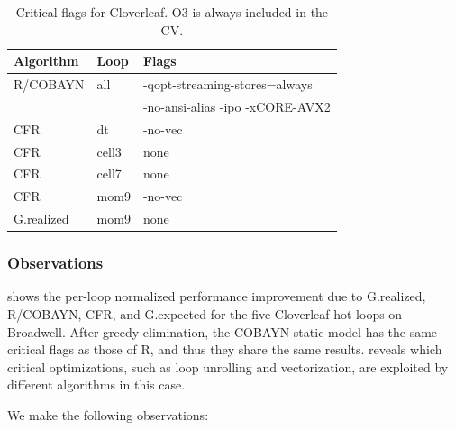 \begin {table}
  \caption{Critical flags for Cloverleaf. O3 is always included in the CV.}
  \vspace{-3mm}
\label{table:algs}
\small
\centering
\begin{tabular}{ l|l|l }
\textbf{Algorithm} & \textbf{Loop} & \textbf{Flags} \\
\hline
R/COBAYN & all &-qopt-streaming-stores=always\\
 & &-no-ansi-alias -ipo -xCORE-AVX2 \\
\hline
CFR& dt & -no-vec\\
\hline
CFR& cell3 & none\\
\hline
CFR& cell7 & none\\
\hline
CFR& mom9 & -no-vec\\
\hline
G.realized & mom9 & none \\
\hline
\end{tabular}
\vspace{-4mm}
\end {table}


\subsubsection{\textbf{Observations}}

 shows the per-loop normalized performance
improvement due to G.realized, R/COBAYN, CFR, and G.expected for the five Cloverleaf
hot loops on Broadwell.  After greedy
elimination, the COBAYN static model has the same critical flags as those
of R, and thus they share the same results.   reveals which critical
optimizations, such as loop unrolling and vectorization, are exploited by
different algorithms in this case.

We make the following observations:

